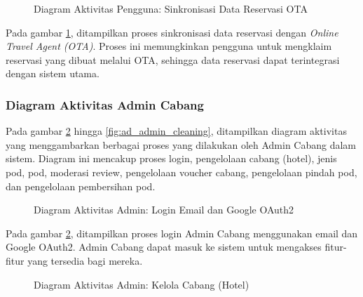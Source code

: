 \begin{figure}[H] %
    \centering
    \caption{Diagram Aktivitas Pengguna: Sinkronisasi Data Reservasi OTA}
    \label{fig:ad_user_otasync} %
\end{figure}

Pada gambar \ref{fig:ad_user_otasync}, ditampilkan proses sinkronisasi data reservasi dengan \textit{Online Travel Agent (OTA)}. Proses ini memungkinkan pengguna untuk mengklaim reservasi yang dibuat melalui OTA, sehingga data reservasi dapat terintegrasi dengan sistem utama.

\subsubsection{Diagram Aktivitas Admin Cabang}

Pada gambar \ref{fig:ad_admin_login} hingga \ref{fig:ad_admin_cleaning}, ditampilkan diagram aktivitas yang menggambarkan berbagai proses yang dilakukan oleh Admin Cabang dalam sistem. Diagram ini mencakup proses login, pengelolaan cabang (hotel), jenis pod, pod, moderasi review, pengelolaan voucher cabang, pengelolaan pindah pod, dan pengelolaan pembersihan pod.

\begin{figure}[H] %
    \centering
    \caption{Diagram Aktivitas Admin: Login Email dan Google OAuth2}
    \label{fig:ad_admin_login} %
\end{figure}

Pada gambar \ref{fig:ad_admin_login}, ditampilkan proses login Admin Cabang menggunakan email dan Google OAuth2. Admin Cabang dapat masuk ke sistem untuk mengakses fitur-fitur yang tersedia bagi mereka.

\begin{figure}[H] %
    \centering
    \caption{Diagram Aktivitas Admin: Kelola Cabang (Hotel)}
    \label{fig:ad_admin_hotel} %
\end{figure}

